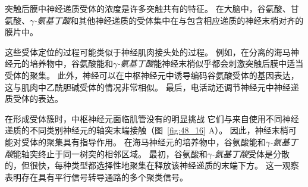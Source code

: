 突触后膜中神经递质受体的浓度是许多突触共有的特征。
在大脑中，谷氨酸、甘氨酸、\textit{$ \gamma $-氨基丁酸}和其他神经递质的受体集中在与包含相应递质的神经末梢对齐的膜片中。


这些受体定位的过程可能类似于神经肌肉接头处的过程。
例如，在分离的海马神经元的培养物中，谷氨酸能和\textit{$ \gamma $-氨基丁酸}能神经末梢似乎都会刺激突触后膜中适当受体的聚集。
此外，神经可以在中枢神经元中诱导编码谷氨酸受体的基因表达，这与肌肉中乙酰胆碱受体的情况非常相似。
最后，电活动还调节神经元中神经递质受体的表达。


在形成受体簇时，中枢神经元面临肌管没有的明显挑战
它们与来自使用不同神经递质的不同类别神经元的轴突末端接触（图~\ref{fig:48_16} A）。
因此，神经末梢可能对受体的聚集具有指导作用。
在海马神经元的培养物中，谷氨酸能和\textit{$ \gamma $-氨基丁酸}能轴突终止于同一树突的相邻区域。
最初，谷氨酸和\textit{$ \gamma $-氨基丁酸}受体是分散的，但很快，每种类型都选择性地聚集在释放该神经递质的末端下方。
这一观察表明存在具有平行信号转导通路的多个聚类信号。


